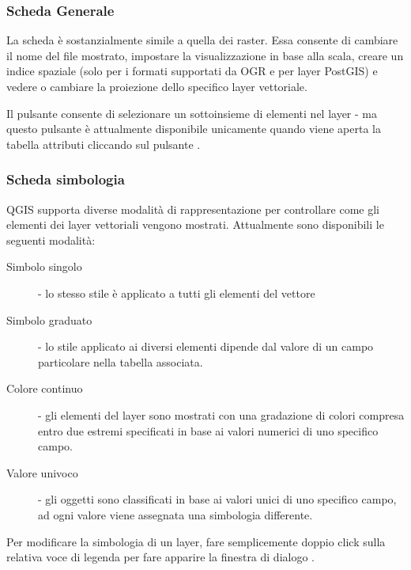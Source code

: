 \subsubsection{Scheda Generale}\label{vectorgeneraltab}
La scheda  è sostanzialmente simile a quella dei raster. Essa
consente di cambiare il nome del file mostrato, impostare la visualizzazione
in base alla scala, creare un indice spaziale (solo per i formati supportati
da OGR e per layer PostGIS) e vedere o cambiare la proiezione dello
specifico layer vettoriale.

Il pulsante  consente di selezionare un sottoinsieme
di elementi nel layer - ma questo pulsante è attualmente disponibile
unicamente quando viene aperta la tabella attributi cliccando sul pulsante
.

\subsubsection{Scheda simbologia}\label{sec:symbology}

QGIS supporta diverse modalità di rappresentazione per controllare come gli
elementi dei layer vettoriali vengono mostrati. Attualmente sono disponibili le
seguenti modalità:

\begin{description} 
    \item[Simbolo singolo] - lo stesso stile è applicato a tutti gli elementi del vettore
    \item[Simbolo graduato] - lo stile applicato ai diversi elementi dipende
    dal valore di un campo particolare nella tabella associata.
    \item[Colore continuo] - gli elementi del layer sono mostrati con una
    gradazione di colori compresa entro due estremi specificati in base ai valori numerici di uno specifico campo.
    \item[Valore univoco] - gli oggetti sono classificati in base ai valori
    unici di uno specifico campo, ad ogni valore viene assegnata una
    simbologia differente.
\end{description}

Per modificare la simbologia di un layer, fare semplicemente doppio click
sulla relativa voce di legenda per fare apparire la finestra di dialogo
.

